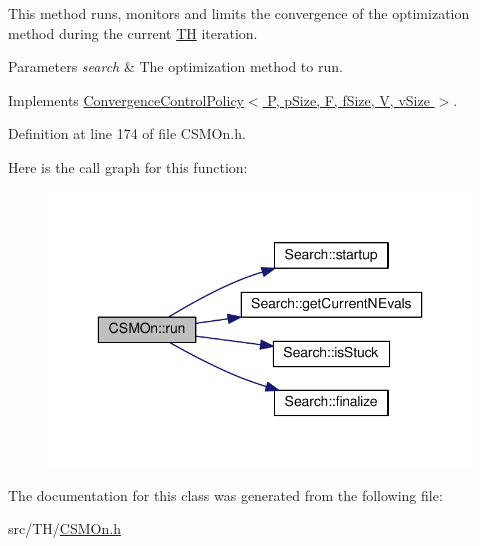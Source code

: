 This method runs, monitors and limits the convergence of the optimization method during the current \hyperlink{classTH}{TH} iteration. 


\begin{DoxyParams}{Parameters}
{\em search} & The optimization method to run. \\
\hline
\end{DoxyParams}


Implements \hyperlink{classConvergenceControlPolicy_ad72beb5807e87c3fa0602bd0bf4679ac}{Convergence\+Control\+Policy$<$ P, p\+Size, F, f\+Size, V, v\+Size $>$}.



Definition at line 174 of file C\+S\+M\+On.\+h.



Here is the call graph for this function\+:\nopagebreak
\begin{figure}[H]
\begin{center}
\leavevmode
\includegraphics[width=336pt]{classCSMOn_a430398bc3e096631f8cd180ee1877616_cgraph}
\end{center}
\end{figure}




The documentation for this class was generated from the following file\+:\begin{DoxyCompactItemize}
\item 
src/\+T\+H/\hyperlink{CSMOn_8h}{C\+S\+M\+On.\+h}\end{DoxyCompactItemize}
